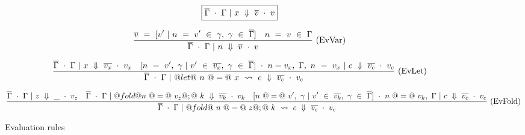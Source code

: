 
\begin{figure*}

$$
\boxed{\overline{\Gamma} ~\cdot~ \Gamma ~|~ x ~\Downarrow~ \overline{v} ~\cdot~ v}
$$


$$
\frac {\displaystyle 
    \overline{v} ~=~ [ v' ~|~ n ~=~ v' ~\in~ \gamma,~ \gamma ~\in~ \overline{\Gamma} ]
    \quad
    n ~=~ v ~\in~ \Gamma
} {\displaystyle  
    \overline{\Gamma} ~\cdot~ \Gamma ~|~ n ~\Downarrow~ \overline{v} ~\cdot~ v
} \ 
\textrm{(EvVar)}
$$

$$
\frac {\displaystyle 
    \overline{\Gamma} ~\cdot~ \Gamma ~|~ x ~\Downarrow~ \overline{v_x} ~\cdot~ v_x
    \quad
    [ n~=~v',~\gamma ~|~ v' ~\in~ \overline{v_x},~\gamma ~\in~ \overline{\Gamma}] ~\cdot~ n=v_x,~\Gamma,~n~=~v_x ~|~ c ~\Downarrow~ \overline{v_c} ~\cdot~ v_c
} {\displaystyle 
    \overline{\Gamma} ~\cdot~ \Gamma ~|~ @let@~n~@=@~x~\leadsto~c ~\Downarrow~ \overline{v_c} ~\cdot~ v_c
} \ 
\textrm{(EvLet)}
$$

$$
\frac {\displaystyle 
    \overline{\Gamma} ~\cdot~ \Gamma ~|~ z ~\Downarrow~ \_ ~\cdot~ v_z
    \quad
    \overline{\Gamma} ~\cdot~ \Gamma ~|~@fold@ n~@=@~v_z@;@~k ~\Downarrow~ \overline{v_k} ~\cdot~ v_k
    \quad
    [n~@=@~v',~\gamma ~|~ v' ~\in~ \overline{v_k},~ \gamma ~\in~ \overline{\Gamma} ] ~\cdot~ n~@=@~v_k,~\Gamma ~|~ c ~\Downarrow~ \overline{v_c} ~\cdot~ v_c
} {\displaystyle 
    \overline{\Gamma} ~\cdot~ \Gamma ~|~ @fold@~n~@=@~z@;@~k~\leadsto~c ~\Downarrow~ \overline{v_c} ~\cdot~ v_c
} \ 
\textrm{(EvFold)}
$$

\caption{Evaluation rules}
\label{fig:source:eval}
\end{figure*}


